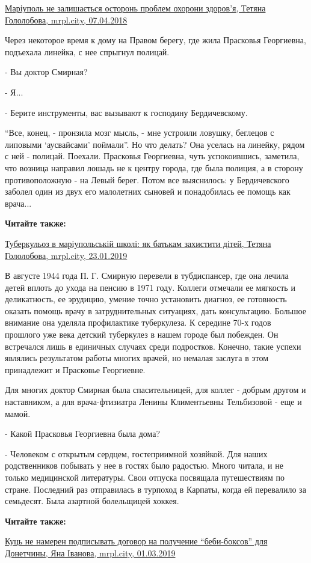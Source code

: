 \href{https://mrpl.city/blogs/view/mariupol-ne-zalishaetsya-ostron-problem-ohoroni-zdorovya}{Маріуполь не залишається осторонь проблем охорони здоров'я, Тетяна Гололобова, mrpl.city, 07.04.2018}

Через некоторое время к дому на Правом берегу, где жила Прасковья Георгиевна,
подъехала линейка, с нее спрыгнул полицай.

- Вы доктор Смирная?

- Я...

- Берите инструменты, вас вызывают к господину Бердичевскому.

\enquote{Все, конец, - пронзила мозг мысль, - мне устроили ловушку, беглецов с липовыми
\enquote{аусвайсами} поймали}. Но что делать? Она уселась на линейку, рядом с ней -
полицай. Поехали. Прасковья Георгиевна, чуть успокоившись, заметила, что
возница направил лошадь не к центру города, где была полиция, а в сторону
противоположную - на Левый берег. Потом все выяснилось: у Бердичевского заболел
один из двух его малолетних сыновей и понадобилась ее помощь как врача...

\textbf{Читайте также:} 

\href{https://mrpl.city/blogs/view/tuberkuloz-v-mariupolskij-shkoli-yak-batkam-zahistiti-ditej}{Туберкульоз в маріупольській школі: як батькам захистити дітей, Тетяна Гололобова, mrpl.city, 23.01.2019}

В августе 1944 года П. Г. Смирную перевели в тубдиспансер, где она лечила детей
вплоть до ухода на пенсию в 1971 году. Коллеги отмечали ее мягкость и
деликатность, ее эрудицию, умение точно установить диагноз, ее готовность
оказать помощь врачу в затруднительных ситуациях, дать консультацию. Большое
внимание она уделяла профилактике туберкулеза. К середине 70-х годов прошлого
уже века детский туберкулез в нашем городе был побежден. Он встречался лишь в
единичных случаях среди подростков. Конечно, такие успехи являлись результатом
работы многих врачей, но немалая заслуга в этом принадлежит и Прасковье
Георгиевне.

Для многих доктор Смирная была спасительницей, для коллег - добрым другом и
наставником, а для врача-фтизиатра Ленины Климентьевны Тельбизовой - еще и
мамой.

- Какой Прасковья Георгиевна была дома?

- Человеком с открытым сердцем, гостеприимной хозяйкой. Для наших родственников
побывать у нее в гостях было радостью. Много читала, и не только медицинской
литературы. Свои отпуска посвящала путешествиям по стране. Последний раз
отправилась в турпоход в Карпаты, когда ей перевалило за семьдесят. Была
азартной болельщицей хоккея.

\textbf{Читайте также:} 

\href{https://mrpl.city/news/view/kuts-ne-nameren-podpisyvat-dogovor-na-poluchenie-bebi-boksov-dlya-donetchiny}{Куць не намерен подписывать договор на получение \enquote{беби-боксов} для Донетчины, Яна Іванова, mrpl.city, 01.03.2019}
